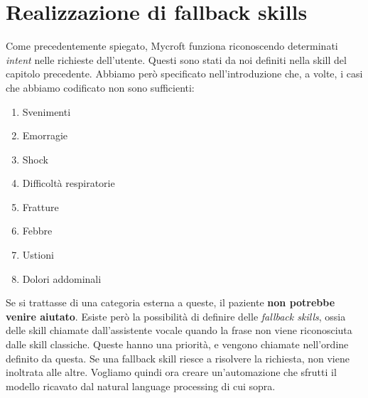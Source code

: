 \section{Realizzazione di fallback skills}
Come precedentemente spiegato, Mycroft funziona riconoscendo determinati \textit{intent} nelle richieste dell'utente. Questi sono stati da noi definiti nella skill del capitolo precedente. Abbiamo però specificato nell'introduzione che, a volte, i casi che abbiamo codificato non sono sufficienti:
\begin{enumerate}
    \item Svenimenti
    \item Emorragie
    \item Shock
    \item Difficoltà respiratorie
    \item Fratture
    \item Febbre
    \item Ustioni
    \item Dolori addominali
\end{enumerate}
Se si trattasse di una categoria esterna a queste, il paziente \textbf{non potrebbe venire aiutato}. Esiste però la possibilità di definire delle \textit{fallback skills}, ossia delle skill chiamate dall'assistente vocale quando la frase non viene riconosciuta dalle skill classiche. Queste hanno una priorità, e vengono chiamate nell'ordine definito da questa. Se una fallback skill riesce a risolvere la richiesta, non viene inoltrata alle altre. Vogliamo quindi ora creare un'automazione che sfrutti il modello ricavato dal natural language processing di cui sopra.
